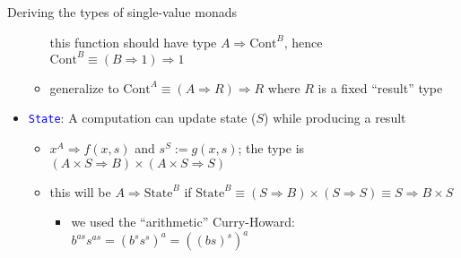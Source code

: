 \documentclass[english]{beamer}
\begin{document}
\begin{frame}{Deriving the types of single-value monads}
\begin{itemize}
\begin{itemize}
this function should have type {\footnotesize{}$A\Rightarrow\text{Cont}^{B}$},
hence{\footnotesize{} $\text{Cont}^{B}\equiv\left(B\Rightarrow1\right)\Rightarrow1$}{\footnotesize \par}
\item generalize to {\footnotesize{}$\text{Cont}^{A}\equiv\left(A\Rightarrow R\right)\Rightarrow R$
}where $R$ is a fixed ``result'' type
\end{itemize}
\item \texttt{\textcolor{blue}{\footnotesize{}State}}: A computation can
update state ($S$) while producing a result
\begin{itemize}
\item $x^{A}\Rightarrow f(x,s)$ and $s^{S}:=g(x,s)$; the type is{\footnotesize{}
$\left(A\times S\Rightarrow B\right)\times\left(A\times S\Rightarrow S\right)$}{\footnotesize \par}
\item this will be $A\Rightarrow\text{State}^{B}$ if {\footnotesize{}$\text{State}^{B}\equiv\left(S\Rightarrow B\right)\times\left(S\Rightarrow S\right)\equiv S\Rightarrow B\times S$ }{\footnotesize \par}
\begin{itemize}
\item we used the ``arithmetic'' Curry-Howard: $b^{as}s^{as}=(b^{s}s^{s})^{a}=\left(\left(bs\right)^{s}\right)^{a}$
\end{itemize}
\end{itemize}
\end{itemize}
\end{frame}
\end{document}
